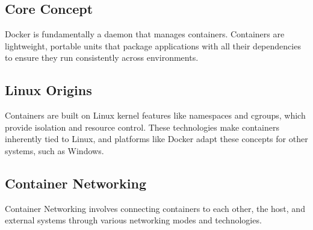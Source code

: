 \newpage
\subsection{Core Concept}
\label{Core Concept}
\begin{NexMainBox}
	\begin{NexMainBox}
		Docker is fundamentally a daemon that manages containers. Containers are lightweight, portable units that package applications with all their dependencies to ensure they run consistently across environments.
	\end{NexMainBox}
\end{NexMainBox}

\subsection{Linux Origins}
\label{Linux Origins}
\begin{NexMainBox}
	\begin{NexMainBox}
		Containers are built on Linux kernel features like namespaces and cgroups, which provide isolation and resource control. These technologies make containers inherently tied to Linux, and platforms like Docker adapt these concepts for other systems, such as Windows.
	\end{NexMainBox}
\end{NexMainBox}

\subsection{Container Networking}
\label{Container Networking}
\begin{NexMainBox}
	\begin{NexMainBox}
		Container Networking involves connecting containers to each other, the host, and external systems through various networking modes and technologies.
	\end{NexMainBox}
	\begin{NexMainBox}
		\begin{NexListDark}
		\end{NexListDark}
	\end{NexMainBox}
\end{NexMainBox}

